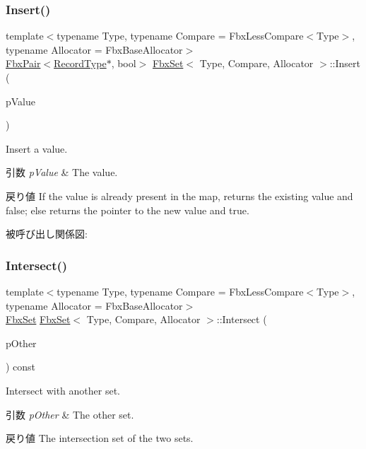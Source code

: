 \subsubsection{\texorpdfstring{Insert()}{Insert()}}
{\footnotesize\ttfamily template$<$typename Type, typename Compare = Fbx\+Less\+Compare$<$\+Type$>$, typename Allocator = Fbx\+Base\+Allocator$>$ \\
\hyperlink{class_fbx_pair}{Fbx\+Pair}$<$\hyperlink{class_fbx_set_aa3934cd434a09288204f5e6c99b9cd01}{Record\+Type}$\ast$, bool$>$ \hyperlink{class_fbx_set}{Fbx\+Set}$<$ Type, Compare, Allocator $>$\+::Insert (\begin{DoxyParamCaption}\item[{const \hyperlink{class_fbx_set_abb0f1b628634e07825532526e2e92baf}{Value\+Type} \&}]{p\+Value }\end{DoxyParamCaption})}

Insert a value. 
\begin{DoxyParams}{引数}
{\em p\+Value} & The value. \\
\hline
\end{DoxyParams}
\begin{DoxyReturn}{戻り値}
If the value is already present in the map, returns the existing value and false; else returns the pointer to the new value and true. 
\end{DoxyReturn}
被呼び出し関係図\+:
\mbox{\label{class_fbx_set_abea1a48c480a2f3ac236f8ff198fc2ce}} 
\subsubsection{\texorpdfstring{Intersect()}{Intersect()}}
{\footnotesize\ttfamily template$<$typename Type, typename Compare = Fbx\+Less\+Compare$<$\+Type$>$, typename Allocator = Fbx\+Base\+Allocator$>$ \\
\hyperlink{class_fbx_set}{Fbx\+Set} \hyperlink{class_fbx_set}{Fbx\+Set}$<$ Type, Compare, Allocator $>$\+::Intersect (\begin{DoxyParamCaption}\item[{const \hyperlink{class_fbx_set}{Fbx\+Set}$<$ Type, Compare, Allocator $>$ \&}]{p\+Other }\end{DoxyParamCaption}) const}

Intersect with another set. 
\begin{DoxyParams}{引数}
{\em p\+Other} & The other set. \\
\hline
\end{DoxyParams}
\begin{DoxyReturn}{戻り値}
The intersection set of the two sets. 
\end{DoxyReturn}
\mbox{\label{class_fbx_set_af9e8e6c464ef4f379218c3ae85e211da}} 
